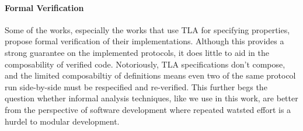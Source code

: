 \paragraph{Formal Verification}
Some of the works, especially the works that use TLA for specifying properties, propose formal verification of their implementations.
Although this provides a strong guarantee on the implemented protocols, it does little to aid in the composability of verified code.
Notoriously, TLA specifications don't compose, and  the limited composabiltiy of definitions means even two of the same protocol run side-by-side must be respecified and re-verified. 
This further begs the question whether informal analysis techniques, like we use in this work, are better from the perspective of software development where repeated watsted effort is a hurdel to modular development.



